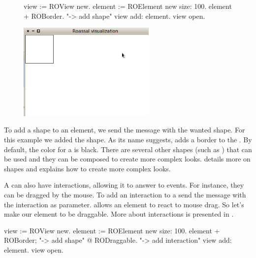 \documentclass[a4paper,10pt,twoside]{book}
\begin{document}
\begin{figure}[H]
      \begin{minipage}[t]{0.5\textwidth}
      \vspace{0pt}
\begin{code}{}
view := ROView new.
element := ROElement new size: 100.
element 
	+ ROBorder. "-> add shape"
view add: element.
view open.
\end{code}
   \end{minipage}
   \hfill
   \begin{minipage}[t]{0.6\textwidth}
      \vspace{0pt} \raggedright
       \centering
		\includegraphics[width=0.6\textwidth]{ex2}
   \end{minipage}
\label{fig:ex2}
\end{figure}

To add a shape to an element, we send the \ct{+} message with the wanted shape. For this example we added the  shape. As its name suggests,  adds a border to the . By default, the color for a  is black. There are several other shapes (such as \sd{}) that can be used and they can be composed to create more complex looks.  details more on shapes and explains how to create more complex looks.

A  can also have interactions, allowing it to answer to events. For instance, they can be dragged by the mouse. To add an interaction to a  send the  message with the interaction as parameter.  allows an element to react to mouse drag. So let's make our element to be draggable. More about interactions is presented in .

\begin{code}{}
view := ROView new.
element := ROElement new size: 100.
element 
	+ ROBorder; "-> add shape"
	@ RODraggable. "-> add interaction"
view add: element.
view open.
\end{code}
\end{document}
